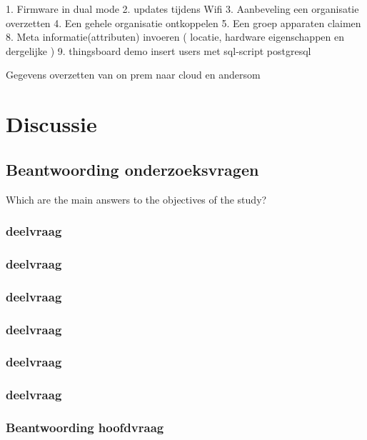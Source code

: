 		1.	Firmware in dual mode
		2.	updates tijdens Wifi
		3.	Aanbeveling een organisatie overzetten
		4.	Een gehele organisatie ontkoppelen
		5.	Een groep apparaten claimen
		8.	Meta informatie(attributen) invoeren ( locatie, hardware eigenschappen en dergelijke )
		9.	thingsboard demo insert users met sql-script postgresql
		
		Gegevens overzetten van on prem naar cloud en andersom
		
		
		\chapter{Discussie}
		
		
		
		\section{Beantwoording onderzoeksvragen}
		
		
		Which are the main answers to the objectives of the study?
		
		\subsection{deelvraag}
		
		\subsection{deelvraag}
		
		\subsection{deelvraag}
		
		\subsection{deelvraag}
		
		\subsection{deelvraag}
		
		\subsection{deelvraag}
		
		\subsection{Beantwoording hoofdvraag}
		
